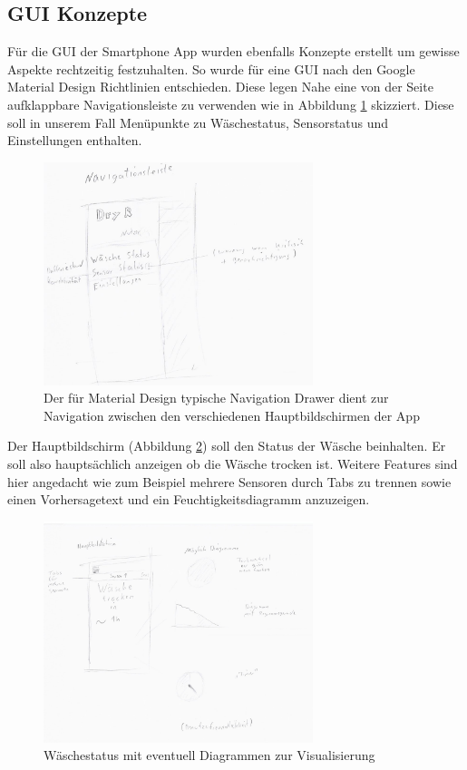 \subsection{GUI Konzepte}
Für die GUI der Smartphone App wurden ebenfalls Konzepte erstellt um gewisse Aspekte rechtzeitig festzuhalten. So wurde für eine GUI nach den Google Material Design Richtlinien entschieden. Diese legen Nahe eine von der Seite aufklappbare Navigationsleiste zu verwenden wie in Abbildung \ref{gui_navdrawer} skizziert. Diese soll in unserem Fall Menüpunkte zu Wäschestatus, Sensorstatus und Einstellungen enthalten.
\begin{figure}[htb] 
	\centerline{\includegraphics*[width=0.7\textwidth]{./Designs/AppGUIConcept_navigationDrawer}}
	\caption{Der für Material Design typische Navigation Drawer dient zur Navigation zwischen den verschiedenen Hauptbildschirmen der App}
	\label{gui_navdrawer}
\end{figure}
Der Hauptbildschirm (Abbildung \ref{gui_laundry_status}) soll den Status der Wäsche beinhalten. Er soll also hauptsächlich anzeigen ob die Wäsche trocken ist. Weitere Features sind hier angedacht wie zum Beispiel mehrere Sensoren durch Tabs zu trennen sowie einen Vorhersagetext und ein Feuchtigkeitsdiagramm anzuzeigen.
\begin{figure}[htb] 
	\centerline{\includegraphics*[width=0.7\textwidth]{./Designs/AppGUIConcept_laundryStatus}}
	\caption{Wäschestatus mit eventuell Diagrammen zur Visualisierung}
	\label{gui_laundry_status}
\end{figure}
